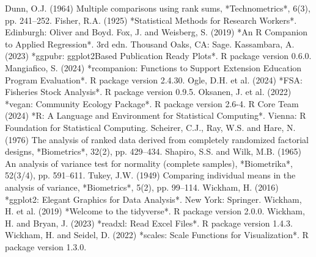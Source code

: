 \documentclass[
]{article}
\newenvironment{Shaded}{\begin{snugshade}}{\end{snugshade}}
\newcommand{\NormalTok}[1]{#1}
\begin{document}
\begin{Shaded}
\begin{Highlighting}[]
\NormalTok{Dunn, O.J. (1964) \textquotesingle{}Multiple comparisons using rank sums\textquotesingle{}, *Technometrics*, 6(3), pp. 241–252.  }
\NormalTok{Fisher, R.A. (1925) *Statistical Methods for Research Workers*. Edinburgh: Oliver and Boyd.  }
\NormalTok{Fox, J. and Weisberg, S. (2019) *An R Companion to Applied Regression*. 3rd edn. Thousand Oaks, CA: Sage.  }
\NormalTok{Kassambara, A. (2023) *ggpubr: \textquotesingle{}ggplot2\textquotesingle{}{-}Based Publication Ready Plots*. R package version 0.6.0.  }
\NormalTok{Mangiafico, S. (2024) *rcompanion: Functions to Support Extension Education Program Evaluation*. R package version 2.4.30.  }
\NormalTok{Ogle, D.H. et al. (2024) *FSA: Fisheries Stock Analysis*. R package version 0.9.5.  }
\NormalTok{Oksanen, J. et al. (2022) *vegan: Community Ecology Package*. R package version 2.6{-}4.  }
\NormalTok{R Core Team (2024) *R: A Language and Environment for Statistical Computing*. Vienna: R Foundation for Statistical Computing.  }
\NormalTok{Scheirer, C.J., Ray, W.S. and Hare, N. (1976) \textquotesingle{}The analysis of ranked data derived from completely randomized factorial designs\textquotesingle{}, *Biometrics*, 32(2), pp. 429–434.  }
\NormalTok{Shapiro, S.S. and Wilk, M.B. (1965) \textquotesingle{}An analysis of variance test for normality (complete samples)\textquotesingle{}, *Biometrika*, 52(3/4), pp. 591–611.  }
\NormalTok{Tukey, J.W. (1949) \textquotesingle{}Comparing individual means in the analysis of variance\textquotesingle{}, *Biometrics*, 5(2), pp. 99–114.  }
\NormalTok{Wickham, H. (2016) *ggplot2: Elegant Graphics for Data Analysis*. New York: Springer.  }
\NormalTok{Wickham, H. et al. (2019) *Welcome to the tidyverse*. R package version 2.0.0.  }
\NormalTok{Wickham, H. and Bryan, J. (2023) *readxl: Read Excel Files*. R package version 1.4.3.  }
\NormalTok{Wickham, H. and Seidel, D. (2022) *scales: Scale Functions for Visualization*. R package version 1.3.0.}
\end{Highlighting}
\end{Shaded}
\end{document}
